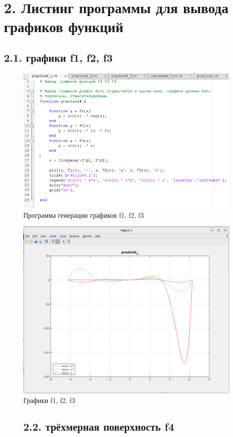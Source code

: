 \documentclass[12pt]{article}
\begin{document}
\newpage
 \section*{2. Листинг программы для вывода графиков функций}%
 
 \subsection*{2.1. графики f1, f2, f3}
\begin{figure}[!h]
	\centering
	\includegraphics[width=\linewidth]{multiple_lines.png}
	\caption{Программа генерации графиков f1, f2, f3}
\end{figure}
\begin{figure}[!h]
	\centering
	\includegraphics[width=\linewidth]{multiple_lines_plot.png}
	\caption{Графики f1, f2, f3}
\end{figure}
\begin{figure}[!h]
  \subsection*{2.2. трёхмерная поверхность f4}
 \end{figure}
\end{document}
